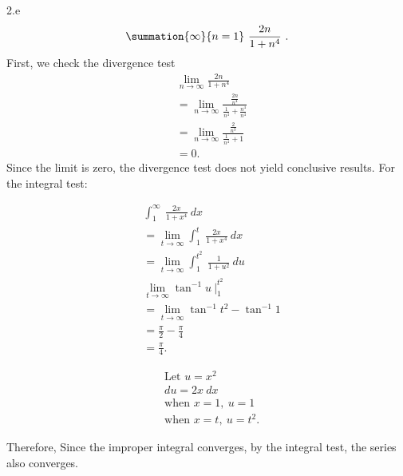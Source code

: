 \documentclass{report}
\begin{document}
    \bigbreak \noindent 
    2.e
    \begin{align*}
        \summation{\infty}{n=1}\ \frac{2n}{1+n^{4}}\ 
    .\end{align*}
    \bigbreak \noindent 
    First, we check the divergence test
    \begin{align*}
        &\lim\limits_{n \to \infty}{\frac{2n}{1+n^{4}}} \\
        &=\lim\limits_{n \to \infty}{\frac{\frac{2n}{n^{4}}}{\frac{1}{n^{4}}+\frac{n^{4}}{n^{4}}}} \\
        &=\lim\limits_{n \to \infty}{\frac{\frac{2}{n^{3}}}{\frac{1}{n^{4}} + 1}} \\
        &= 0
    .\end{align*}
    Since the limit is zero, the divergence test does not yield conclusive results. For the integral test:
    \bigbreak \noindent 
    \begin{minipage}[t]{0.47\textwidth}
    \begin{align*}
        &\int_{1}^{\infty}\ \frac{2x}{1+x^{4}}\ dx \\
        &=\lim\limits_{t \to \infty}{\int_{1}^{t}\ \frac{2x}{1+x^{4}}\ dx} \\
        &=\lim\limits_{t \to \infty}{\int_{1}^{t^{2}}\ \frac{1}{1+u^{2}}\ du} \\
        &\lim\limits_{t \to \infty}{\tan^{-1}{u}}\ \bigg|_1^{t^{2}} \\
        &=\lim\limits_{t \to \infty}{\tan^{-1}{t^{2}}} - \tan^{-1}{1} \\
        &= \frac{\pi}{2} - \frac{\pi}{4} \\
        &=\frac{\pi}{4}
    .\end{align*}
    \end{minipage}
        \begin{minipage}[t]{0.47\textwidth}
        \begin{align*}
            &\text{Let $u=x^{2}$} \\
            &du = 2x\ dx \\
            &\text{when } x = 1,\ u= 1 \\
            &\text{when } x = t,\ u=t^{2} 
        .\end{align*}
    \end{minipage}
    \bigbreak \noindent 
    Therefore, Since the improper integral converges, by the integral test, the series also converges.


    



    
    
\end{document}
